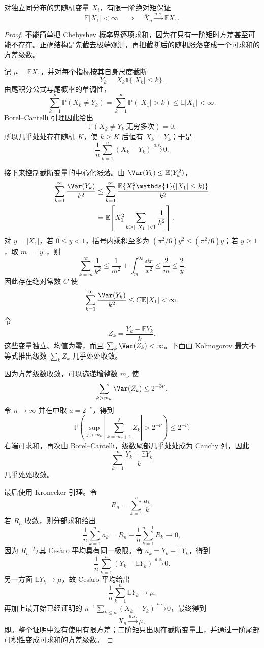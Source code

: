 \begin{theorem}
对独立同分布的实随机变量 $X_i$，有限一阶绝对矩保证
\begin{equation}\label{eq:math-stat-slln-l1}
 \mathbb E|X_1|<\infty
 \quad\Longrightarrow\quad
 \overline X_n\xrightarrow{a.s.}\mathbb E X_1.
\end{equation}
\end{theorem}
\begin{proof}
不能简单把 Chebyshev 概率界逐项求和，因为在只有一阶矩时方差甚至可能不存在。正确结构是先截去极端观测，再把截断后的随机涨落变成一个可求和的方差级数。

记 $\mu=\mathbb E X_1$，并对每个指标按其自身尺度截断
\[
 Y_k=X_k\mathds{1}\{|X_k|\le k\}.
\]
由尾积分公式与尾概率的单调性，
\[
 \sum_{k=1}^\infty\mathbb P(X_k\ne Y_k)
 =\sum_{k=1}^\infty\mathbb P(|X_1|>k)
 \le\mathbb E|X_1|<\infty.
\]
Borel--Cantelli 引理因此给出
\[
 \mathbb P(X_k\ne Y_k\ \text{无穷多次})=0.
\]
所以几乎处处存在随机 $K$，使 $k\ge K$ 后恒有 $X_k=Y_k$；于是
\[
 \frac1n\sum_{k=1}^n(X_k-Y_k)\xrightarrow{a.s.}0.
\]

接下来控制截断变量的中心化涨落。由 $\Var(Y_k)\le\mathbb E(Y_k^2)$，
\begin{align*}
 \sum_{k=1}^\infty\frac{\Var(Y_k)}{k^2}
 &\le
 \sum_{k=1}^\infty
 \frac{\mathbb E\{X_1^2\mathds{1}(|X_1|\le k)\}}{k^2}\\
 &=\mathbb E\!\left[
 X_1^2
 \sum_{k\ge \lceil |X_1|\rceil\vee1}\frac1{k^2}
 \right].
\end{align*}
对 $y=|X_1|$，若 $0\le y<1$，括号内乘积至多为 $(\pi^2/6)y^2\le(\pi^2/6)y$；若 $y\ge1$，取 $m=\lceil y\rceil$，则
\[
 \sum_{k=m}^\infty\frac1{k^2}
 \le\frac1{m^2}+\int_m^\infty\frac{\dd x}{x^2}
 \le\frac2m
 \le\frac2y.
\]
因此存在绝对常数 $C$ 使
\[
 \sum_{k=1}^\infty\frac{\Var(Y_k)}{k^2}
 \le C\mathbb E|X_1|<\infty.
\]
令
\[
 Z_k=\frac{Y_k-\mathbb E Y_k}{k}.
\]
这些变量独立、均值为零，而且 $\sum_k\Var(Z_k)<\infty$。下面由 Kolmogorov 最大不等式推出级数 $\sum_kZ_k$ 几乎处处收敛。

因为方差级数收敛，可以选递增整数 $m_\nu$ 使
\[
 \sum_{k>m_\nu}\Var(Z_k)\le2^{-3\nu}.
\]
令 $n\to\infty$ 并在中取 $a=2^{-\nu}$，得到
\[
 \mathbb P\!\left(
 \sup_{j>m_\nu}
 \left|\sum_{k=m_\nu+1}^jZ_k\right|>2^{-\nu}
 \right)
 \le2^{-\nu}.
\]
右端可求和，再次由 Borel--Cantelli，级数尾部几乎处处成为 Cauchy 列，因此
\[
 \sum_{k=1}^\infty\frac{Y_k-\mathbb E Y_k}{k}
\]
几乎处处收敛。

最后使用 Kronecker 引理。令
\[
 R_n=\sum_{k=1}^n\frac{a_k}{k}.
\]
若 $R_n$ 收敛，则分部求和给出
\[
 \frac1n\sum_{k=1}^na_k
 =R_n-\frac1n\sum_{k=1}^{n-1}R_k\longrightarrow0,
\]
因为 $R_n$ 与其 Ces\`aro 平均具有同一极限。令 $a_k=Y_k-\mathbb E Y_k$，得到
\[
 \frac1n\sum_{k=1}^n(Y_k-\mathbb E Y_k)\xrightarrow{a.s.}0.
\]
另一方面 $\mathbb E Y_k\to\mu$，故 Ces\`aro 平均给出
\[
 \frac1n\sum_{k=1}^n\mathbb E Y_k\to\mu.
\]
再加上最开始已经证明的 $n^{-1}\sum_{k\le n}(X_k-Y_k)\xrightarrow{a.s.}0$，最终得到
\[
 \overline X_n\xrightarrow{a.s.}\mu,
\]
即。整个证明中没有使用有限方差；二阶矩只出现在截断变量上，并通过一阶尾部可积性变成可求和的方差级数。

\end{proof}

